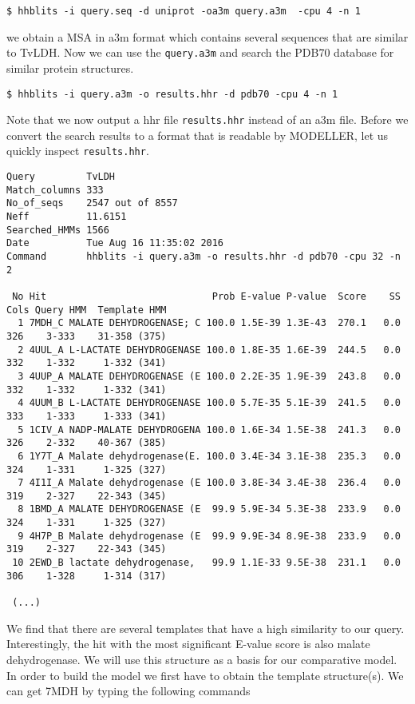 \documentclass[11pt,a4paper]{article}
\begin{document}
\begin{verbatim}
$ hhblits -i query.seq -d uniprot -oa3m query.a3m  -cpu 4 -n 1
\end{verbatim}

we obtain a MSA in a3m format which contains several sequences that are similar to TvLDH. Now we can use the \verb`query.a3m` and search the PDB70 database for similar protein structures.

\begin{verbatim}
$ hhblits -i query.a3m -o results.hhr -d pdb70 -cpu 4 -n 1
\end{verbatim}

Note that we now output a hhr file \verb`results.hhr` instead of an a3m file. Before we convert the search results to a format that is readable by MODELLER, let us quickly inspect \verb`results.hhr`.

\footnotesize 
\begin{verbatim}
Query         TvLDH
Match_columns 333
No_of_seqs    2547 out of 8557
Neff          11.6151
Searched_HMMs 1566
Date          Tue Aug 16 11:35:02 2016
Command       hhblits -i query.a3m -o results.hhr -d pdb70 -cpu 32 -n 2

 No Hit                             Prob E-value P-value  Score    SS Cols Query HMM  Template HMM
  1 7MDH_C MALATE DEHYDROGENASE; C 100.0 1.5E-39 1.3E-43  270.1   0.0  326    3-333    31-358 (375)
  2 4UUL_A L-LACTATE DEHYDROGENASE 100.0 1.8E-35 1.6E-39  244.5   0.0  332    1-332     1-332 (341)
  3 4UUP_A MALATE DEHYDROGENASE (E 100.0 2.2E-35 1.9E-39  243.8   0.0  332    1-332     1-332 (341)
  4 4UUM_B L-LACTATE DEHYDROGENASE 100.0 5.7E-35 5.1E-39  241.5   0.0  333    1-333     1-333 (341)
  5 1CIV_A NADP-MALATE DEHYDROGENA 100.0 1.6E-34 1.5E-38  241.3   0.0  326    2-332    40-367 (385)
  6 1Y7T_A Malate dehydrogenase(E. 100.0 3.4E-34 3.1E-38  235.3   0.0  324    1-331     1-325 (327)
  7 4I1I_A Malate dehydrogenase (E 100.0 3.8E-34 3.4E-38  236.4   0.0  319    2-327    22-343 (345)
  8 1BMD_A MALATE DEHYDROGENASE (E  99.9 5.9E-34 5.3E-38  233.9   0.0  324    1-331     1-325 (327)
  9 4H7P_B Malate dehydrogenase (E  99.9 9.9E-34 8.9E-38  233.9   0.0  319    2-327    22-343 (345)
 10 2EWD_B lactate dehydrogenase,   99.9 1.1E-33 9.5E-38  231.1   0.0  306    1-328     1-314 (317)
 
 (...)
\end{verbatim}
\normalsize

We find that there are several templates that have a high similarity to our query. Interestingly, the hit with the most significant E-value score is also malate dehydrogenase. We will use this structure as a basis for our comparative model. In order to build the model we first have to obtain the template structure(s). We can get 7MDH by typing the following commands
\end{document}
